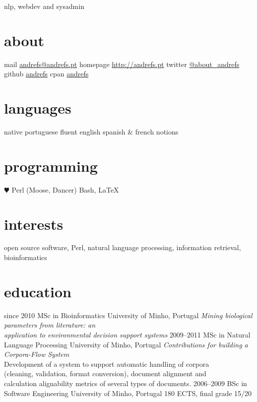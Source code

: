 \documentclass[a4paper]{friggeri-cv}
\begin{document}
       {nlp, webdev and sysadmin}


\begin{aside}
  \section{about}
  	{\scriptsize mail}
    \href{mailto:andrefs@andrefs.pt}{\small andrefs@andrefs.pt}
  	{\scriptsize homepage}
    \href{http://andrefs.pt}{\small http://andrefs.pt}
  	{\scriptsize twitter}
    \href{http://twitter.com/about\_andrefs}{\small @about\_andrefs}
  	{\scriptsize github}
    \href{http://github.com/andrefs}{\small andrefs}
  	{\scriptsize cpan}
    \href{http://search.cpan.org/~andrefs}{\small andrefs}
  \section{languages}
  	native portuguese
	fluent english
    spanish \& french notions
  \section{programming}
    {$\varheartsuit$} Perl
    (Moose, Dancer)
	Bash, \LaTeX
\end{aside}

\section{interests}

open source software, Perl, natural language processing, information retrieval,
bioinformatics

\section{education}

\begin{entrylist}
  \entry
    {{\footnotesize since} 2010}
    {MSc in Bioinformatics}
    {University of Minho, Portugal}
    {\emph{Mining biological parameters from literature: an\\
	application to environmental decision support systems}}
  \entry
    {2009–2011}
    {MSc in Natural Language Processing}
    {University of Minho, Portugal}
    {\emph{Contributions for building a Corpora-Flow System}\\
	\footnotesize{Development of a system to support automatic handling of corpora\\
	(cleaning, validation, format conversion), document alignment and\\
	calculation alignability metrics of several types of documents.}
	}
  \entry
    {2006--2009}
    {BSc in Software Engineering}
    {University of Minho, Portugal}
    {180 ECTS, final grade 15/20}
\end{entrylist}
\end{document}
